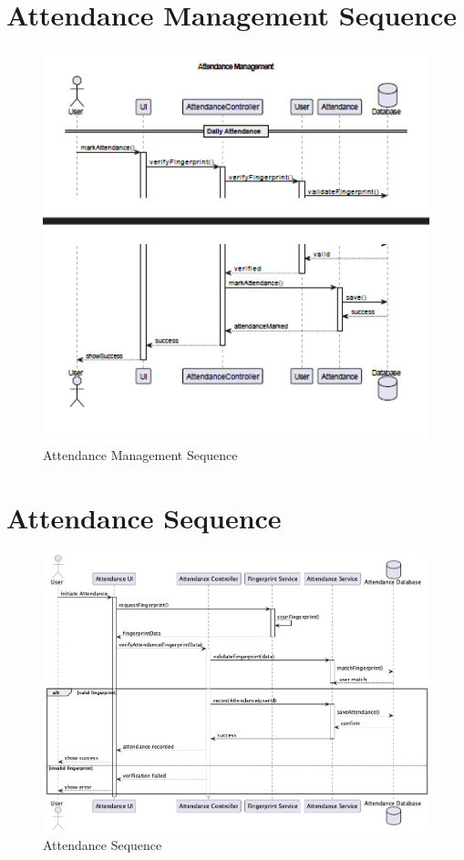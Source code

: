 \documentclass[12pt,a4paper]{report}
\begin{document}
\section{Attendance Management Sequence}
\begin{figure}[htbp]
    \centering
    \includegraphics[width=1\textwidth]{attendance-management-sequence.png}
    \caption{Attendance Management Sequence}
    \label{fig:attendance-management-sequence}
\end{figure}

\section{Attendance Sequence}
\begin{figure}[htbp]
    \centering
    \includegraphics[width=1\textwidth]{attendance-sequence.png}
    \caption{Attendance Sequence}
    \label{fig:attendance-sequence}
\end{figure}
\end{document}
